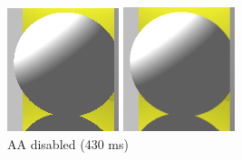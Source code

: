 \begin{figure}[H]
    \centering
    \includegraphics[width=\linewidth]{img/antialiasing/no_aa.png}
    \caption{AA disabled (430 ms)}
\endminipage\hfill
{}
    \centering
    \includegraphics[width=\linewidth]{img/antialiasing/super8x.png}

\end{figure}
